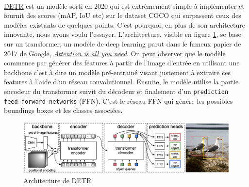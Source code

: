 \paragraph{} 
\href{https://github.com/facebookresearch/detr}{DETR} est un modèle sorti en 2020 qui est extrêmement simple à implémenter et 
fournit des scores (mAP, IoU etc) sur le dataset COCO qui surpassent ceux des modèles 
existants de quelques points. C’est pourquoi, en plus de son architecture innovante, 
nous avons voulu l’essayer.
L’architecture, visible en figure \ref{fig:detr_architecture}, se base sur un transformer, un modèle de deep learning parut dans le fameux
papier de 2017 de Google, \href{https://arxiv.org/pdf/1706.03762.pdf}{\textit{Attention is all you need}}.
On peut observer que le modèle commence par génèrer des features à partir de l'image
 d'entrée en utilisant une backbone c'est à dire un modèle pré-entrainé visant justement à extraire 
 ces features à l'aide d'un réseau convolutionnel. Ensuite, le modèle utilise la partie encodeur du transformer suivit
 du décodeur et finalement d'un \verb|prediction feed-forward networks| (FFN). C'est le réseau FFN qui génère les
 possibles boundings boxes et les classes associées.
\begin{figure}[th!]
    \centering
    \includegraphics[width=\textwidth]{images/detr_architecture.png}
    \caption{Architecture de DETR}
    \label{fig:detr_architecture}
\end{figure}
